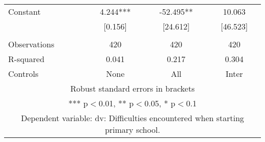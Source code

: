 \begin{tabular}{lccc}
Constant & 4.244*** & -52.495** & 10.063 \\
 & [0.156] & [24.612] & [46.523] \\
 &  &  &  \\
Observations & 420 & 420 & 420 \\
R-squared & 0.041 & 0.217 & 0.304 \\
 Controls & None & All & Inter \\ \hline
\multicolumn{4}{c}{ Robust standard errors in brackets} \\
\multicolumn{4}{c}{ *** p$<$0.01, ** p$<$0.05, * p$<$0.1} \\
\multicolumn{4}{c}{ Dependent variable: dv: Difficulties encountered when starting primary school.} \\
\end{tabular}
